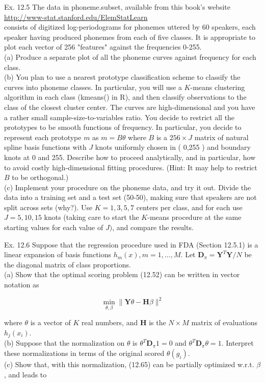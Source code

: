 \documentclass[10pt]{article}
\begin{document}
Ex. 12.5 The data in phoneme.subset, available from this book's website\\
\href{http://www-stat.stanford.edu/ElemStatLearn}{http://www-stat.stanford.edu/ElemStatLearn}\\
consists of digitized log-periodograms for phonemes uttered by 60 speakers, each speaker having produced phonemes from each of five classes. It is appropriate to plot each vector of 256 "features" against the frequencies 0-255.\\
(a) Produce a separate plot of all the phoneme curves against frequency for each class.\\
(b) You plan to use a nearest prototype classification scheme to classify the curves into phoneme classes. In particular, you will use a $K$-means clustering algorithm in each class (kmeans() in R), and then classify observations to the class of the closest cluster center. The curves are high-dimensional and you have a rather small sample-size-to-variables ratio. You decide to restrict all the prototypes to be smooth functions of frequency. In particular, you decide to represent each prototype $m$ as $m=B \theta$ where $B$ is a $256 \times J$ matrix of natural spline basis functions with $J$ knots uniformly chosen in ( 0,255 ) and boundary knots at 0 and 255. Describe how to proceed analytically, and in particular, how to avoid costly high-dimensional fitting procedures. (Hint: It may help to restrict $B$ to be orthogonal.)\\
(c) Implement your procedure on the phoneme data, and try it out. Divide the data into a training set and a test set (50-50), making sure that speakers are not split across sets (why?). Use $K=1,3,5,7$ centers per class, and for each use $J=5,10,15$ knots (taking care to start the $K$-means procedure at the same starting values for each value of $J)$, and compare the results.

Ex. 12.6 Suppose that the regression procedure used in FDA (Section 12.5.1) is a linear expansion of basis functions $h_{m}(x), m=1, \ldots, M$. Let $\mathbf{D}_{\pi}= \mathbf{Y}^{T} \mathbf{Y} / N$ be the diagonal matrix of class proportions.\\
(a) Show that the optimal scoring problem (12.52) can be written in vector notation as


\begin{equation*}
\min _{\theta, \beta}\|\mathbf{Y} \theta-\mathbf{H} \beta\|^{2} \tag{12.65}
\end{equation*}


where $\theta$ is a vector of $K$ real numbers, and $\mathbf{H}$ is the $N \times M$ matrix of evaluations $h_{j}\left(x_{i}\right)$.\\
(b) Suppose that the normalization on $\theta$ is $\theta^{T} \mathbf{D}_{\pi} 1=0$ and $\theta^{T} \mathbf{D}_{\pi} \theta=1$. Interpret these normalizations in terms of the original scored $\theta\left(g_{i}\right)$.\\
(c) Show that, with this normalization, (12.65) can be partially optimized w.r.t. $\beta$, and leads to
\end{document}
